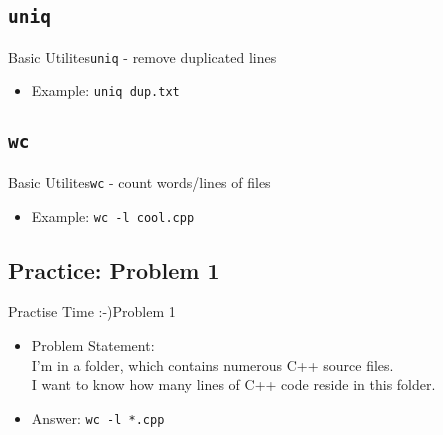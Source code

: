 \documentclass[aspectratio=169]{beamer}
\begin{document}
\subsection{\tt uniq}
\begin{frame}{Basic Utilites}{\texttt{uniq} - remove duplicated lines}

\begin{itemize}[<+->]
\item
  Example: \texttt{uniq\ dup.txt}
\end{itemize}

\end{frame}

\subsection{\tt wc}
\begin{frame}{Basic Utilites}{\texttt{wc} - count words/lines of files}

\begin{itemize}[<+->]
\item
  Example: \texttt{wc\ -l\ cool.cpp}
\end{itemize}

\end{frame}


\subsection{Practice: Problem 1}
\begin{frame}{Practise Time :-)}{Problem 1}

\begin{itemize}[<+->]
\item
  Problem Statement:\\
  I'm in a folder, which contains numerous C++ source files.\\
  I want to know how many lines of C++ code reside in this folder.
\item
  Answer: \texttt{wc\ -l\ *.cpp}
\end{itemize}

\end{frame}
\end{document}
